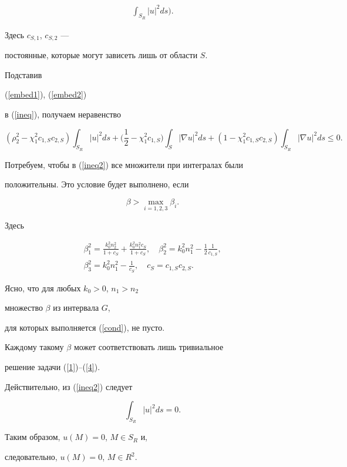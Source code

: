 \begin{pf}
\begin{align}
\int_{S_R}|u|^2 ds\bigg). 


\end{align}


Здесь $c_{S,1}$, $c_{S,2}$ ---


постоянные, которые могут зависеть лишь от области $S$.


Подставив 


(\ref{embed1}), (\ref{embed2})


в (\ref{ineq}), получаем неравенство


\begin{equation}


\label{ineq2}


(\rho_2^2 - \chi_1^2 c_{1,S} c_{2,S})\int_{S_R}|u|^2 ds +


\bigg(\frac{1}{2} - \chi_1^2 c_{1,S}


\bigg)\int_{S}|\nabla u|^2 ds + 


(1 - \chi_1^2 c_{1,S} c_{2,S})\int_{S_R}|\nabla u|^2 ds\le 0.


\end{equation}


Потребуем, чтобы в (\ref{ineq2}) все множители при интегралах были


положительны. Это условие будет выполнено, если


\begin{equation}


\label{cond}


\beta > \max_{i=1,2,3}\beta_i.


\end{equation}


Здесь 


\begin{gather*}


\beta_1^2=\frac{k_0^2n_2^2}{1+c_S} + \frac{k_0^2n_1^2c_S}{1+c_S}, \quad


\beta_2^2=k_0^2n_1^2-\frac{1}{2} \frac{1}{c_{1,S}},\\


\beta_3^2=k_0^2n_1^2-\frac{1}{c_S}, \quad


c_S=c_{1,S}c_{2,S}. 


\end{gather*}


Ясно, что для любых $k_0>0$, $n_1>n_2$ 


множество $\beta$ из интервала $G$, 


для которых выполняется (\ref{cond}), не пусто.


Каждому такому $\beta$ может соответствовать лишь тривиальное 


решение задачи (\ref{1})--(\ref{4}). 


Действительно, из (\ref{ineq2}) следует


$$


\int_{S_R}|u|^2 ds = 0.


$$


Таким образом, $u(M)=0$, $M \in S_R$ и, 


следовательно, $u(M)=0$, $M \in R^2$.


\end{pf}





